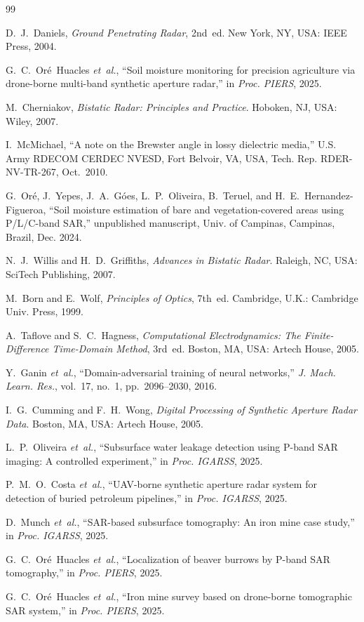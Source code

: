 \documentclass[conference]{IEEEtran}
\begin{document}
\begin{thebibliography}{99}

D.~J.~Daniels, \emph{Ground Penetrating Radar}, 2nd~ed. New York, NY, USA: IEEE Press, 2004.

G.~C.~Oré~Huacles \emph{et~al.}, ``Soil moisture monitoring for precision agriculture via drone-borne multi-band synthetic aperture radar,'' in \emph{Proc. PIERS}, 2025.

M.~Cherniakov, \emph{Bistatic Radar: Principles and Practice}. Hoboken, NJ, USA: Wiley, 2007.

I.~McMichael, ``A note on the Brewster angle in lossy dielectric media,'' U.S. Army RDECOM CERDEC NVESD, Fort Belvoir, VA, USA, Tech. Rep. RDER-NV-TR-267, Oct.~2010.

G.~Oré, J.~Yepes, J.~A.~Góes, L.~P.~Oliveira, B.~Teruel, and H.~E.~Hernandez-Figueroa,
``Soil moisture estimation of bare and vegetation-covered areas using P/L/C-band SAR,''
unpublished manuscript, Univ. of Campinas, Campinas, Brazil, Dec. 2024.

N.~J.~Willis and H.~D.~Griffiths, \emph{Advances in Bistatic Radar}. Raleigh, NC, USA: SciTech Publishing, 2007.

M.~Born and E.~Wolf, \emph{Principles of Optics}, 7th~ed. Cambridge, U.K.: Cambridge Univ. Press, 1999.

A.~Taflove and S.~C.~Hagness, \emph{Computational Electrodynamics: The Finite-Difference Time-Domain Method}, 3rd~ed. Boston, MA, USA: Artech House, 2005.

Y.~Ganin \emph{et~al.}, ``Domain-adversarial training of neural networks,'' \emph{J. Mach. Learn. Res.}, vol.~17, no.~1, pp.~2096--2030, 2016.

I.~G.~Cumming and F.~H.~Wong, \emph{Digital Processing of Synthetic Aperture Radar Data}. Boston, MA, USA: Artech House, 2005.

L.~P.~Oliveira \emph{et~al.}, ``Subsurface water leakage detection using P-band SAR imaging: A controlled experiment,'' in \emph{Proc. IGARSS}, 2025.

P.~M.~O.~Costa \emph{et~al.}, ``UAV-borne synthetic aperture radar system for detection of buried petroleum pipelines,'' in \emph{Proc. IGARSS}, 2025.

D.~Munch \emph{et~al.}, ``SAR-based subsurface tomography: An iron mine case study,'' in \emph{Proc. IGARSS}, 2025.

G.~C.~Oré~Huacles \emph{et~al.}, ``Localization of beaver burrows by P-band SAR tomography,'' in \emph{Proc. PIERS}, 2025.

G.~C.~Oré~Huacles \emph{et~al.}, ``Iron mine survey based on drone-borne tomographic SAR system,'' in \emph{Proc. PIERS}, 2025.

\end{thebibliography}
\end{document}
